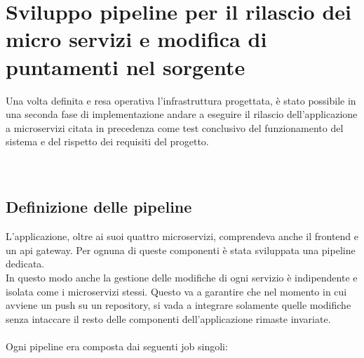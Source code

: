\documentclass[a4paper,12pt]{report}
\begin{document}
\section{Sviluppo pipeline per il rilascio dei micro servizi e modifica di puntamenti nel sorgente}
Una volta definita e resa operativa l'infrastruttura progettata, è stato possibile in una seconda fase di implementazione andare a eseguire il rilascio dell'applicazione a microservizi citata in precedenza come test conclusivo del funzionamento del sistema e del rispetto dei requisiti del progetto. \\ \\ \\
\subsection{Definizione delle pipeline}
L'applicazione, oltre ai suoi quattro microservizi, comprendeva anche il frontend e un api gateway. Per ognuna di queste componenti è stata sviluppata una pipeline dedicata.\\
In questo modo anche la gestione delle modifiche di ogni servizio è indipendente e isolata come i microservizi stessi. Questo va a garantire che nel momento in cui avviene un push su un repository, si vada a integrare solamente quelle modifiche senza intaccare il resto delle componenti dell'applicazione rimaste invariate.\\ \\
Ogni pipeline era composta dai seguenti job singoli:\\
\end{document}
